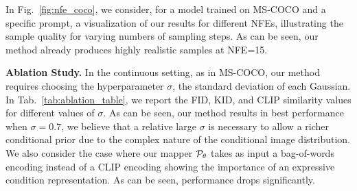 In Fig.~\ref{fig:nfe_coco}, we consider, for a model trained on MS-COCO and a specific prompt, a visualization of our results for different NFEs, illustrating the sample quality for varying numbers of sampling steps. As can be seen, our method already produces highly realistic samples at NFE=15. 




\noindent \textbf{Ablation Study.} \quad
In the continuous setting, as in MS-COCO, our method requires choosing the hyperparameter $\sigma$, the standard deviation of each Gaussian. 
In Tab.~\ref{tab:ablation_table}, we report the FID, KID, and CLIP similarity values for different values of $\sigma$. As can be seen, our method results in best performance when $\sigma=0.7$, we believe that a relative large $\sigma$ is necessary to allow a richer conditional prior due to the complex nature of the conditional image distribution. 
We also consider the case where our mapper ${\mathcal{P}}_\theta$ takes as input a bag-of-words encoding instead of a CLIP encoding showing the importance of an expressive condition representation. As can be seen, performance drops significantly. 













